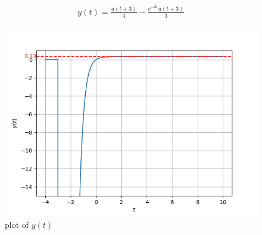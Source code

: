 \documentclass[journal,12pt,twocolumn]{IEEEtran}
\theoremstyle{remark}
\begin{document}
\begin{align}
y(t) = \frac{u(t+3)}{3} - \frac{e^{-3t}u(t+3)}{3}
\end{align}
\begin{figure}[h!]
    \centering
    \includegraphics[width=0.8\columnwidth]{figs/plot.png}
    \caption{plot of $y(t)$}
    \label{fig:gate202138fig}
\end{figure}
\end{document}
